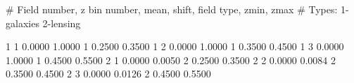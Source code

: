 \documentclass[12pt]{book} %
\newenvironment{alltt}{\ttfamily}{\par}
\begin{document}
\begin{alltt}
\begin{center}
\begin{boxedverbatim}
# Field number, z bin number, mean, shift, field type, zmin, zmax
# Types: 1-galaxies 2-lensing

     1      1   0.0000   1.0000      1   0.2500   0.3500
     1      2   0.0000   1.0000      1   0.3500   0.4500
     1      3   0.0000   1.0000      1   0.4500   0.5500
     2      1   0.0000   0.0050      2   0.2500   0.3500
     2      2   0.0000   0.0084      2   0.3500   0.4500
     2      3   0.0000   0.0126      2   0.4500   0.5500
\end{boxedverbatim}
\end{center}
\end{alltt}
\end{document}
